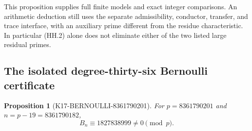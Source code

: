 \documentclass[11pt,a4paper]{article}
\newtheorem{proposition}[theorem]{Proposition}
\theoremstyle{definition}
\begin{document}
This proposition supplies full finite models and exact integer
comparisons. An arithmetic deduction still uses the separate
admissibility, conductor, transfer, and trace interface, with an
auxiliary prime different from the residue characteristic. In
particular (HH.2) alone does not eliminate either of the two listed
large residual primes.

\subsection{The isolated degree-thirty-six Bernoulli certificate}
\label{sec:bernoulli-residual-prime36}

\begin{proposition}[K17-BERNOULLI-8361790201]
\label{prop:bernoulli-residue36}
For $p=8361790201$ and $n=p-19=8361790182$,
\[
                         B_n\equiv1827838999\ne0\pmod p.
 \tag{BC36.1}
\]
\end{proposition}
\end{document}
